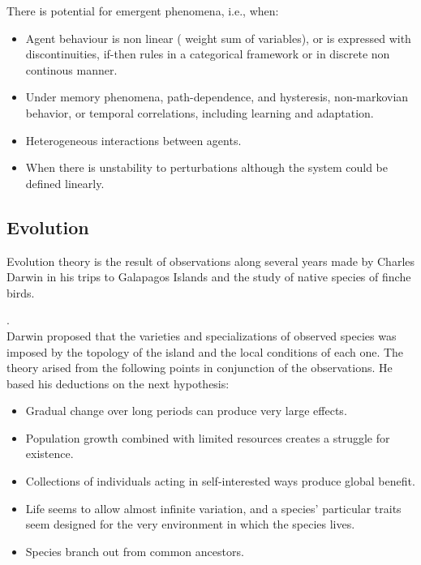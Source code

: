 \documentclass[11pt,oneside,a4paper,openright]{report}
\begin{document}
There is potential for emergent phenomena, i.e., when: 
\begin{itemize}
 \item Agent behaviour is non linear ( weight sum of variables), or is expressed with discontinuities, if-then rules in a categorical framework or in discrete non continous manner.
 \item Under memory phenomena, path-dependence, and hysteresis, non-markovian behavior, or temporal correlations, including learning and adaptation. 
 \item Heterogeneous interactions between agents.
 \item When there is unstability to perturbations although the system could be defined linearly.
\end{itemize}


\subsection{Evolution}

Evolution theory is the result of observations along several years made by Charles Darwin in his trips to Galapagos Islands and the study of native species of finche birds. 

. 
\\
Darwin proposed that the varieties and specializations of observed species was imposed by the topology of the 
island and the local conditions of each one. The theory arised from the following points in conjunction of the observations. He based his deductions on the next hypothesis:
\begin{itemize}
	\item Gradual change over long periods can produce very large effects.
	\item Population growth combined with limited resources creates a struggle for
	existence. 
	\item Collections of individuals acting in self-interested ways produce
	global benefit. 
	\item Life seems to allow almost infinite variation, and a species’
	particular traits seem designed for the very environment in which the species
	lives. 
	\item Species branch out from common ancestors.
\end{itemize}
\end{document}
